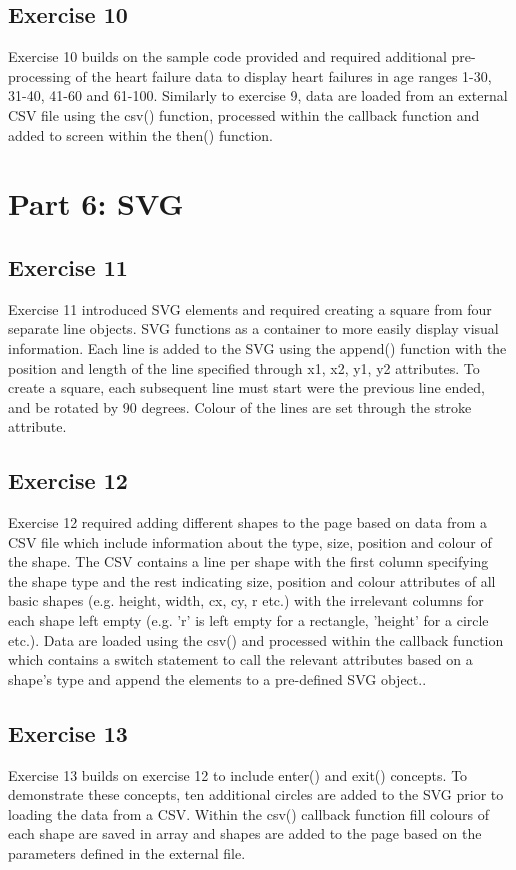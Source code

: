 \documentclass[11pt]{article}   	%
\begin{document}
\subsection{Exercise 10 }
\vspace{-1em}
Exercise 10 builds on the sample code provided and required additional pre-processing of the heart failure data to display heart failures in age ranges 1-30, 31-40, 41-60 and 61-100. Similarly to exercise 9, data are loaded from an external CSV file using the csv() function, processed within the callback function and added to screen within the then() function. 


\section{Part 6: SVG}
\subsection{Exercise 11 }
\vspace{-1em}
Exercise 11 introduced SVG elements and required creating a square from four separate line objects. SVG functions as a container to more easily display visual  information. Each line is added to the SVG using the append() function with the position and length of the line specified through x1, x2, y1, y2 attributes. To create a square, each subsequent line must start were the previous line ended, and be rotated by 90 degrees. Colour of the lines are set through the stroke attribute.

\subsection{Exercise 12 }
\vspace{-1em}
Exercise 12 required adding different shapes to the page based on data from a CSV file which include information about the type, size, position and colour of the shape. The CSV contains a line per shape with the first column specifying the shape type and the rest indicating size, position and colour attributes of all basic shapes (e.g. height, width, cx, cy, r etc.) with the irrelevant columns for each shape left empty (e.g. 'r' is left empty for a rectangle, 'height' for a circle etc.).  Data are loaded using the csv() and processed within the callback function which contains a switch statement to call the relevant attributes based on a shape's type and append the elements to a pre-defined SVG object..

\subsection{ Exercise 13 }
\vspace{-1em}
Exercise 13 builds on exercise 12 to include enter() and exit() concepts. To demonstrate these concepts, ten additional circles are added to the SVG prior to loading the data from a CSV. Within the csv() callback function fill colours of each shape are saved in array and shapes are added to the page based on the parameters defined in the external file. 
\end{document}
